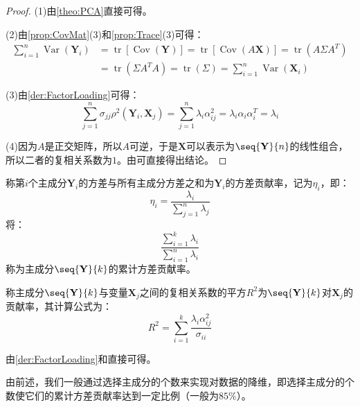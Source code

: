 \begin{proof}
	(1)由\cref{theo:PCA}直接可得。\par
	(2)由\cref{prop:CovMat}(3)和\cref{prop:Trace}(3)可得：
	\begin{align*}
		\sum_{i=1}^{n}\operatorname{Var}(\mathbf{Y}_i)
		&=\operatorname{tr}[\operatorname{Cov}(\mathbf{Y})]=\operatorname{tr}[\operatorname{Cov}(A\mathbf{X})]=\operatorname{tr}(A\Sigma A^T) \\
		&=\operatorname{tr}(\Sigma A^TA)=\operatorname{tr}(\Sigma)=\sum_{i=1}^{n}\operatorname{Var}(\mathbf{X}_i)
	\end{align*}\par
	(3)由\cref{der:FactorLoading}可得：
	\begin{equation*}
		\sum_{j=1}^{n}\sigma_{jj}\rho^2(\mathbf{Y}_i,\mathbf{X}_j)=\sum_{j=1}^{n}\lambda_i\alpha_{ij}^2=\lambda_i\alpha_i\alpha_i^T=\lambda_i
	\end{equation*}\par
	(4)因为$A$是正交矩阵，所以$A$可逆，于是$\mathbf{X}$可以表示为$\seq{\mathbf{Y}}{n}$的线性组合，所以二者的复相关系数为$1$。由可直接得出结论。
\end{proof}
\begin{definition}
	称第$i$个主成分$\mathbf{Y}_i$的方差与所有主成分方差之和为$\mathbf{Y}_i$的方差贡献率，记为$\eta_i$，即：
	\begin{equation*}
		\eta_i=\frac{\lambda_i}{\sum\limits_{j=1}^{n}\lambda_j}
	\end{equation*}
	将：
	\begin{equation*}
		\frac{\sum\limits_{i=1}^{k}\lambda_i}{\sum\limits_{i=1}^{n}\lambda_i}
	\end{equation*}
	称为主成分$\seq{\mathbf{Y}}{k}$的累计方差贡献率。
\end{definition}
\begin{definition}
	称主成分$\seq{\mathbf{Y}}{k}$与变量$\mathbf{X}_j$之间的复相关系数的平方$R^2$为$\seq{\mathbf{Y}}{k}$对$\mathbf{X}_j$的贡献率，其计算公式为：
	\begin{equation*}
		R^2=\sum_{i=1}^{k}\frac{\lambda_i\alpha_{ij}^2}{\sigma_{ii}}
	\end{equation*}
\end{definition}
\begin{derivation}
	由\cref{der:FactorLoading}和直接可得。
\end{derivation}
由前述，我们一般通过选择主成分的个数来实现对数据的降维，即选择主成分的个数使它们的累计方差贡献率达到一定比例（一般为$85\%$）。

